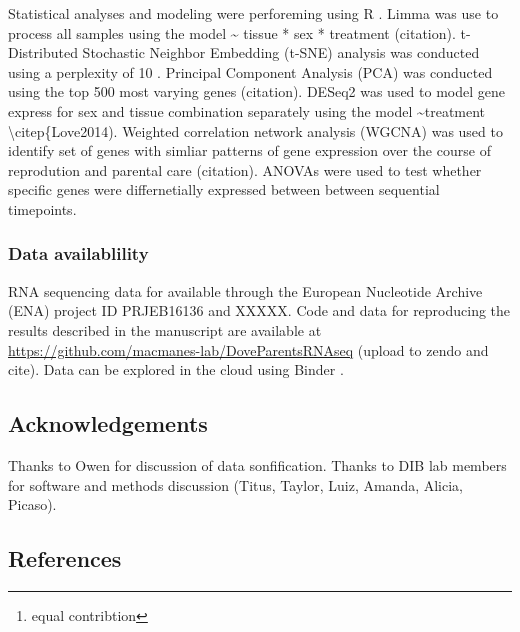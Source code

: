 Statistical analyses and modeling were perforeming using R
\citep{RDevelopmentCoreTeam2013, Wickham2016}. Limma was use to process
all samples using the model \textasciitilde{} tissue * sex * treatment
(citation). t-Distributed Stochastic Neighbor Embedding (t-SNE) analysis
was conducted using a perplexity of 10 \citep{VanDerMaaten2008}.
Principal Component Analysis (PCA) was conducted using the top 500 most
varying genes (citation). DESeq2 was used to model gene express for sex
and tissue combination separately using the model
\textasciitilde{}treatment \textbackslash{}citep\{Love2014). Weighted
correlation network analysis (WGCNA) was used to identify set of genes
with simliar patterns of gene expression over the course of reprodution
and parental care (citation). ANOVAs were used to test whether specific
genes were differnetially expressed between between sequential
timepoints.

\hypertarget{data-availablility}{%
\subsubsection{Data availablility}\label{data-availablility}}

RNA sequencing data for available through the European Nucleotide
Archive (ENA) project ID PRJEB16136 and XXXXX. Code and data for
reproducing the results described in the manuscript are available at
\url{https://github.com/macmanes-lab/DoveParentsRNAseq} (upload to zendo
and cite). Data can be explored in the cloud using Binder
\citep{project_jupyter-proc-scipy-2018}.

\hypertarget{acknowledgements}{%
\subsection{Acknowledgements}\label{acknowledgements}}

Thanks to Owen for discussion of data sonfification. Thanks to DIB lab
members for software and methods discussion (Titus, Taylor, Luiz,
Amanda, Alicia, Picaso).

\hypertarget{references}{%
\subsection{References}\label{references}}




\address{%
Rayna M Harris \footnote{equal contribtion}\\
UC Davis\\
\\
}


